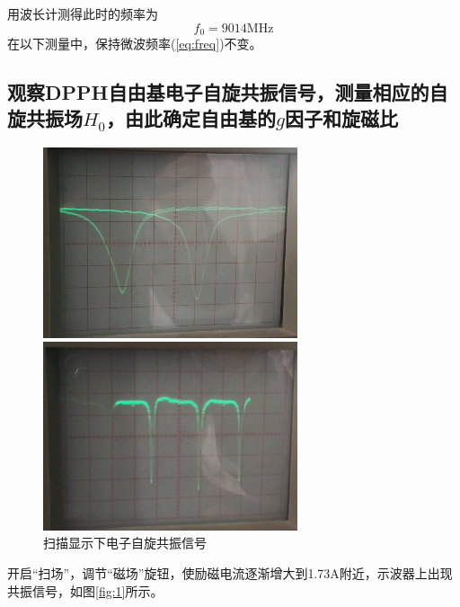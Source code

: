 \documentclass[aps,pre,12pt,preprint,onecolumn,showpacs,showkeys]{revtex4-1}
\begin{document}
    用波长计测得此时的频率为
    \begin{equation}
        f_0=9014 \mathrm{MHz}\label{eq:freq}
    \end{equation}
    在以下测量中，保持微波频率(\ref{eq:freq})不变。

    \subsection{观察DPPH自由基电子自旋共振信号，测量相应的自旋共振场$H_0$，由此确定自由基的$g$因子和旋磁比}

    \begin{figure}[ht]
        \begin{minipage}{.5\textwidth}
            \centering
            \includegraphics[width=75mm]{fig_1}
            \caption{\label{fig:1}%
            X-Y显示下电子自旋共振信号}
        \end{minipage}%
        \begin{minipage}{0.5\textwidth}
            \centering
            \includegraphics[width=75mm]{fig_2}
            \caption{\label{fig:2}%
            扫描显示下电子自旋共振信号}
        \end{minipage}
        
    \end{figure}

    开启“扫场”，调节“磁场”旋钮，使励磁电流逐渐增大到1.73A附近，示波器上出现共振信号，如图\ref{fig:1}所示。
\end{document}

